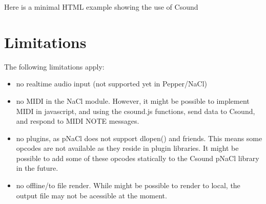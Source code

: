 \documentclass[11pt]{article}
\begin{document}
Here is a minimal HTML example showing the use of Csound



\section{Limitations}

The following limitations apply:

\begin{itemize}
\item no realtime audio input (not supported yet in Pepper/NaCl)
\item no MIDI in the NaCl module. However, it might be possible to implement MIDI in javascript, and using the csound.js functions,
send data to Csound, and respond to MIDI NOTE messages.
\item no plugins, as pNaCl does not support dlopen() and friends. This means some opcodes are not available as they reside in plugin libraries.
It might be possible to add some of these opcodes statically to the Csound pNaCl library in the future.
\item no offline/to file render. While might be possible to render to local, the output file may not be acessible at the moment.
\end {itemize}
\end{document}
